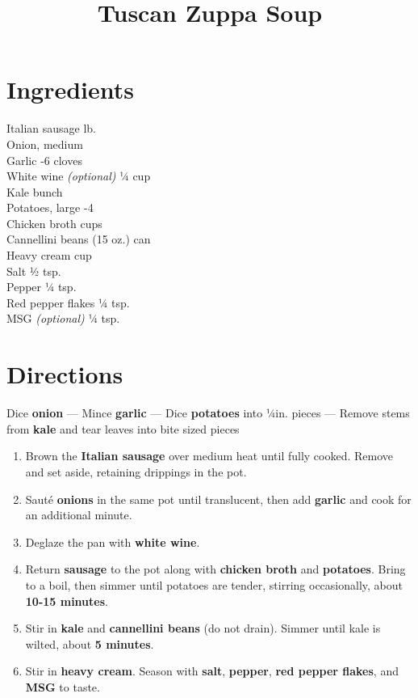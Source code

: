 \documentclass[11pt,letterpaper]{article}
\title{Tuscan Zuppa Soup}
\author{}
\date{}
\begin{document}
\maketitle
\thispagestyle{empty}

\section*{Ingredients}
\setlength{\columnsep}{20pt}
\begin{multicols}{2}
\noindent
    Italian sausage  lb. \\
    Onion, medium  \\
    Garlic -6 cloves \\
    White wine \textit{(optional)} \dotfill ¼ cup \\
    Kale  bunch \\
    Potatoes, large -4 \\
    \columnbreak
    Chicken broth  cups \\
    Cannellini beans  (15 oz.) can \\
    Heavy cream  cup \\
    Salt \dotfill ½ tsp.\\
    Pepper \dotfill ¼ tsp. \\
	Red pepper flakes \dotfill ¼ tsp. \\
    MSG \textit{(optional)} \dotfill ¼ tsp.
\end{multicols}

\section*{Directions}

\noindent
Dice \textbf{onion} ---
Mince \textbf{garlic} ---
Dice \textbf{potatoes} into ¼in. pieces ---
Remove stems from \textbf{kale} and tear leaves into bite sized pieces

\begin{enumerate}
    \item Brown the \textbf{Italian sausage} over medium heat until fully cooked. Remove and set aside, retaining drippings in the pot.
    \item Sauté \textbf{onions} in the same pot until translucent, then add \textbf{garlic} and cook for an additional minute.
    \item Deglaze the pan with \textbf{white wine}.
    \item Return \textbf{sausage} to the pot along with \textbf{chicken broth} and \textbf{potatoes}. Bring to a boil, then simmer until potatoes are tender, stirring occasionally, about \textbf{10-15 minutes}.
    \item Stir in \textbf{kale} and \textbf{cannellini beans} (do not drain). Simmer until kale is wilted, about \textbf{5 minutes}.
    \item Stir in \textbf{heavy cream}. Season with \textbf{salt}, \textbf{pepper}, \textbf{red pepper flakes}, and \textbf{MSG} to taste.
\end{enumerate}
\end{document}
